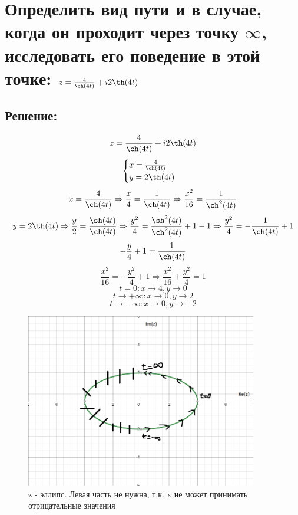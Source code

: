 \documentclass{article}
\begin{document}
	
	
	
	\section{Определить вид пути и в случае, когда он проходит через точку $\infty$, исследовать его поведение в этой точке: $z = \frac{4}{\ch(4t)} + i2\th(4t)$}
	\subsection{Решение:}
	\[z = \frac{4}{\ch(4t)} + i2\th(4t)\]
	\[\begin{cases}
		x = \frac{4}{\ch(4t)} \\
		y = 2 \th(4t)
	\end{cases}\]
	\[x= \frac{4}{\ch (4t)} \Rightarrow \frac{x}{4} = \frac{1}{\ch (4t)} \Rightarrow \frac{x^2}{16} = \frac{1}{\ch^2 (4t)}\]
	\[y = 2 \th(4t) \Rightarrow \frac{y}{2} = \frac{\sh(4t)}{\ch(4t)} \Rightarrow\frac{y^2}{4} = \frac{\sh^2(4t)}{\ch^2(4t)} + 1 -1 \Rightarrow\frac{y^2}{4} = -\frac{1}{\ch(4t)}+1\]
	\[-\frac{y}{4} + 1 = \frac{1}{\ch(4t)}\]
	\[\frac{x^2}{16} = -\frac{y^2}{4} + 1 \Rightarrow \frac{x^2}{16} + \frac{y^2}{4} = 1\]
	\[t =0 : x \rightarrow 4, y \rightarrow 0\]
	\[t \rightarrow +\infty : x \rightarrow 0, y \rightarrow 2\]
	\[t \rightarrow -\infty : x \rightarrow 0, y \rightarrow -2\]
	
	
	\begin{figure}[h]
		\centering
		\includegraphics[width= 0.9\textwidth]	{7.png}
		\caption{z - эллипс. Левая часть не нужна, т.к. x не может принимать отрицательные значения}
		\label{fig:your_label}
	\end{figure}
	
\end{document}
